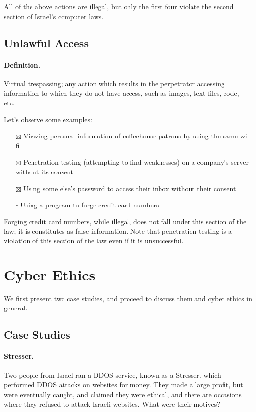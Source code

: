 All of the above actions are illegal, but only the first four violate the second section of Israel's computer laws.

\subsection{Unlawful Access}

\paragraph{Definition.} Virtual trespassing; any action which results in the perpetrator accessing information to which they do not have access, such as images, text files, code, etc.

Let's observe some examples:
\begin{itemize}
    \item[$\boxtimes$] Viewing personal information of coffeehouse patrons by using the same wi-fi
    \item[$\boxtimes$] Penetration testing (attempting to find weaknesses) on a company's server without its consent
    \item[$\boxtimes$] Using some else's password to access their inbox without their consent
    \item[$\square$] Using a program to forge credit card numbers
\end{itemize}

Forging credit card numbers, while illegal, does not fall under this section of the law; it is constitutes as false information. Note that penetration testing is a violation of this section of the law even if it is unsuccessful.

\section{Cyber Ethics}\label{sec:cyber_ethics}

We first present two case studies, and proceed to discuss them and cyber ethics in general.

\subsection{Case Studies}

\paragraph{Stresser.} Two people from Israel ran a DDOS service, known as a Stresser, which performed DDOS attacks on websites for money. They made a large profit, but were eventually caught, and claimed they were ethical, and there are occasions where they refused to attack Israeli websites. What were their motives?

